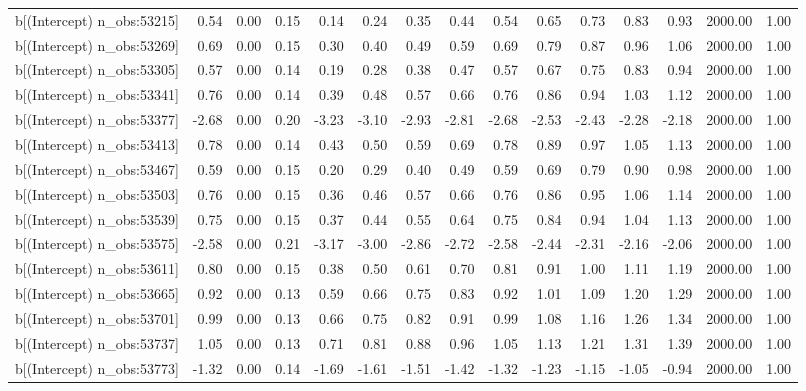 \begin{table}[ht]
\begin{tabular}{rrrrrrrrrrrrrrr}
  b[(Intercept) n\_obs:53215] & 0.54 & 0.00 & 0.15 & 0.14 & 0.24 & 0.35 & 0.44 & 0.54 & 0.65 & 0.73 & 0.83 & 0.93 & 2000.00 & 1.00 \\ 
  b[(Intercept) n\_obs:53269] & 0.69 & 0.00 & 0.15 & 0.30 & 0.40 & 0.49 & 0.59 & 0.69 & 0.79 & 0.87 & 0.96 & 1.06 & 2000.00 & 1.00 \\ 
  b[(Intercept) n\_obs:53305] & 0.57 & 0.00 & 0.14 & 0.19 & 0.28 & 0.38 & 0.47 & 0.57 & 0.67 & 0.75 & 0.83 & 0.94 & 2000.00 & 1.00 \\ 
  b[(Intercept) n\_obs:53341] & 0.76 & 0.00 & 0.14 & 0.39 & 0.48 & 0.57 & 0.66 & 0.76 & 0.86 & 0.94 & 1.03 & 1.12 & 2000.00 & 1.00 \\ 
  b[(Intercept) n\_obs:53377] & -2.68 & 0.00 & 0.20 & -3.23 & -3.10 & -2.93 & -2.81 & -2.68 & -2.53 & -2.43 & -2.28 & -2.18 & 2000.00 & 1.00 \\ 
  b[(Intercept) n\_obs:53413] & 0.78 & 0.00 & 0.14 & 0.43 & 0.50 & 0.59 & 0.69 & 0.78 & 0.89 & 0.97 & 1.05 & 1.13 & 2000.00 & 1.00 \\ 
  b[(Intercept) n\_obs:53467] & 0.59 & 0.00 & 0.15 & 0.20 & 0.29 & 0.40 & 0.49 & 0.59 & 0.69 & 0.79 & 0.90 & 0.98 & 2000.00 & 1.00 \\ 
  b[(Intercept) n\_obs:53503] & 0.76 & 0.00 & 0.15 & 0.36 & 0.46 & 0.57 & 0.66 & 0.76 & 0.86 & 0.95 & 1.06 & 1.14 & 2000.00 & 1.00 \\ 
  b[(Intercept) n\_obs:53539] & 0.75 & 0.00 & 0.15 & 0.37 & 0.44 & 0.55 & 0.64 & 0.75 & 0.84 & 0.94 & 1.04 & 1.13 & 2000.00 & 1.00 \\ 
  b[(Intercept) n\_obs:53575] & -2.58 & 0.00 & 0.21 & -3.17 & -3.00 & -2.86 & -2.72 & -2.58 & -2.44 & -2.31 & -2.16 & -2.06 & 2000.00 & 1.00 \\ 
  b[(Intercept) n\_obs:53611] & 0.80 & 0.00 & 0.15 & 0.38 & 0.50 & 0.61 & 0.70 & 0.81 & 0.91 & 1.00 & 1.11 & 1.19 & 2000.00 & 1.00 \\ 
  b[(Intercept) n\_obs:53665] & 0.92 & 0.00 & 0.13 & 0.59 & 0.66 & 0.75 & 0.83 & 0.92 & 1.01 & 1.09 & 1.20 & 1.29 & 2000.00 & 1.00 \\ 
  b[(Intercept) n\_obs:53701] & 0.99 & 0.00 & 0.13 & 0.66 & 0.75 & 0.82 & 0.91 & 0.99 & 1.08 & 1.16 & 1.26 & 1.34 & 2000.00 & 1.00 \\ 
  b[(Intercept) n\_obs:53737] & 1.05 & 0.00 & 0.13 & 0.71 & 0.81 & 0.88 & 0.96 & 1.05 & 1.13 & 1.21 & 1.31 & 1.39 & 2000.00 & 1.00 \\ 
  b[(Intercept) n\_obs:53773] & -1.32 & 0.00 & 0.14 & -1.69 & -1.61 & -1.51 & -1.42 & -1.32 & -1.23 & -1.15 & -1.05 & -0.94 & 2000.00 & 1.00 \\ 

\end{tabular}
\end{table}
